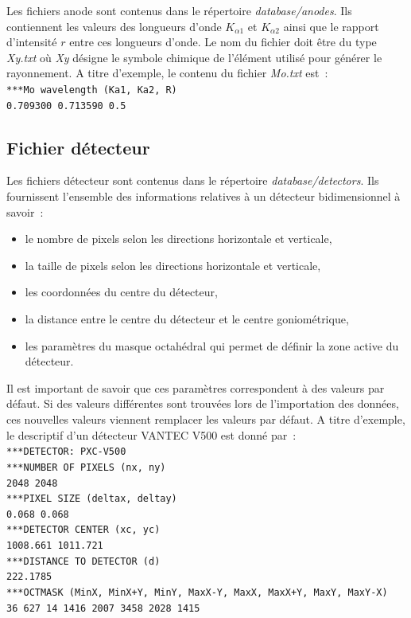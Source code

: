 \documentclass[french,a4paper]{report}
\begin{document}
Les fichiers anode sont contenus dans le répertoire \textit{database/anodes}. Ils contiennent les valeurs des longueurs d'onde $K_{\alpha 1}$ et $K_{\alpha 2}$ ainsi que le rapport d'intensité $r$ entre ces longueurs d'onde. Le nom du fichier doit être du type \textit{Xy.txt} où \textit{Xy} désigne le symbole chimique de l'élément utilisé pour générer le rayonnement. A titre d'exemple, le contenu du fichier \textit{Mo.txt} est~:\\
\texttt{***Mo wavelength (Ka1, Ka2, R)} \\
\texttt{0.709300   0.713590  0.5}

\label{sec_fichieranode}

\subsection{Fichier détecteur}

Les fichiers détecteur sont contenus dans le répertoire \textit{database/detectors}. Ils fournissent l'ensemble des informations relatives à un détecteur bidimensionnel à savoir~:
\begin{itemize}
\item{le nombre de pixels selon les directions horizontale et verticale,}
\item{la taille de pixels selon les directions horizontale et verticale,}
\item{les coordonnées du centre du détecteur,}
\item{la distance entre le centre du détecteur et le centre goniométrique,}
\item{les paramètres du masque octahédral qui permet de définir la zone active du détecteur.}
\end{itemize}
Il est important de savoir que ces paramètres correspondent à des valeurs par défaut. Si des valeurs différentes sont trouvées lors de l'importation des données, ces nouvelles valeurs viennent remplacer les valeurs par défaut. A titre d'exemple, le descriptif d'un détecteur VANTEC V500 est donné par~:\\
\texttt{***DETECTOR: PXC-V500} \\
\texttt{***NUMBER OF PIXELS (nx, ny)} \\
\texttt{2048     2048} \\
\texttt{***PIXEL SIZE (deltax, deltay)} \\
\texttt{0.068    0.068} \\
\texttt{***DETECTOR CENTER (xc, yc)} \\
\texttt{1008.661      1011.721} \\
\texttt{***DISTANCE TO DETECTOR (d)} \\
\texttt{222.1785} \\
\texttt{***OCTMASK (MinX, MinX+Y, MinY, MaxX-Y, MaxX, MaxX+Y, MaxY, MaxY-X)} \\
\texttt{36  627  14  1416  2007  3458   2028  1415 } \\
\end{document}
